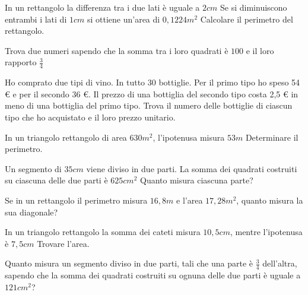 \begin{multicols}{2}
\begin{esercizio}[\Ast]
 \label{ese:6.56}
In un rettangolo la differenza tra i due lati è uguale a \(2\unit{cm}\) Se si diminuiscono entrambi i lati di \( 1\unit{cm} \) si ottiene un'area di \(0,1224\unit{m^2}\) Calcolare il perimetro del rettangolo.
\end{esercizio}

\begin{esercizio}[\Ast]
 \label{ese:6.57}
Trova due numeri sapendo che la somma tra i loro quadrati è \( 100 \) e il loro rapporto \( \frac 3 4 \)
\end{esercizio}

\begin{esercizio}[\Ast]
 \label{ese:6.58}
Ho comprato due tipi di vino. In tutto 30 bottiglie. Per il primo tipo ho speso 54 € e per il secondo 36 €. Il prezzo di una bottiglia del secondo tipo costa 2,5 € in meno di una bottiglia del primo tipo. Trova il numero delle bottiglie di ciascun tipo che ho acquistato e il loro prezzo unitario.
\end{esercizio}

\begin{esercizio}[\Ast]
 \label{ese:6.59}
In un triangolo rettangolo di area \(630\unit{m^2}\), l'ipotenusa misura \(53\unit{m}\) Determinare il perimetro.
\end{esercizio}

\begin{esercizio}[\Ast]
 \label{ese:6.60}
Un segmento di \(35\unit{cm}\) viene diviso in due parti. La somma dei quadrati costruiti su ciascuna delle due parti è \(625\unit{{cm}^2}\) Quanto misura ciascuna parte?
\end{esercizio}

\begin{esercizio}[\Ast]
 \label{ese:6.61}
Se in un rettangolo il perimetro misura \( 16,8\unit{m} \) e l'area \( 17,28\unit{m^2} \), quanto misura la sua diagonale?
\end{esercizio}

\begin{esercizio}[\Ast]
 \label{ese:6.62}
In un triangolo rettangolo la somma dei cateti misura \( 10,5\unit{cm} \), mentre l'ipotenusa è \( 7,5\unit{cm} \) Trovare l'area.
\end{esercizio}

\begin{esercizio}[\Ast]
 \label{ese:6.63}
Quanto misura un segmento diviso in due parti, tali che una parte è \( \frac 3 4 \) dell'altra, sapendo che la somma dei quadrati costruiti su ognuna delle due parti è uguale a \(121\unit{{cm}^2}\)?
\end{esercizio}


\end{multicols}

